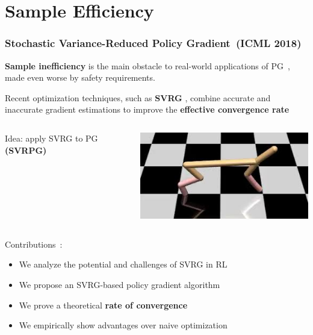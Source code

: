 \documentclass{beamer}
\begin{document}
\section{Sample Efficiency}


\begin{frame}
\frametitle{Stochastic Variance-Reduced Policy Gradient~\small(ICML 2018)}
\textbf{Sample inefficiency} is the main obstacle to real-world applications of PG~\cite{recht2018tour}, made even worse by safety requirements.

\vfill

Recent optimization techniques, such as \textbf{SVRG} \cite{johnson2013accelerating}, combine accurate and inaccurate gradient estimations to improve the \textbf{effective convergence rate}

\vfill

\begin{columns}
	\begin{column}{0.59\textwidth}
		Idea: apply SVRG to PG \textbf{(SVRPG)}
	\end{column}
	\begin{column}{0.29\textwidth}
		\includegraphics[width=\textwidth]{pics/cheetah.jpeg}
	\end{column}
\end{columns}

\vfill

\colorbox{cyan!10}{
	\begin{minipage}{\textwidth}
Contributions~\cite{pmlr-v80-papini18a}:
\begin{itemize}
	\item We analyze the potential and challenges of SVRG in RL
	\item We propose an SVRG-based policy gradient algorithm
	\item We prove a theoretical \textbf{rate of convergence}
	\item We empirically show advantages over naive optimization
\end{itemize}
\end{minipage}
}
\end{frame}
\end{document}
